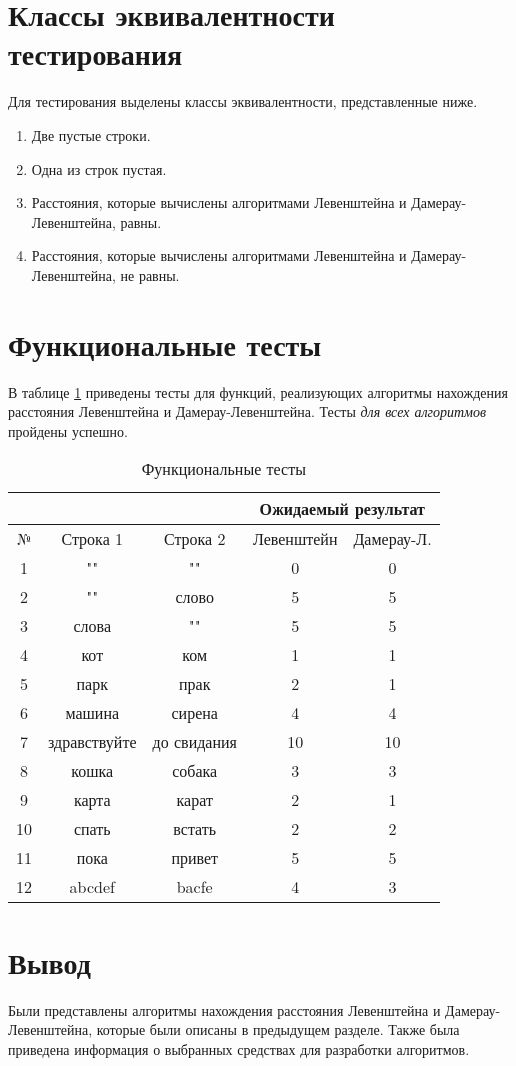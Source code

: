 \section{Классы эквивалентности тестирования}

Для тестирования выделены классы эквивалентности, представленные ниже.

\begin{enumerate}[label=\arabic*)]
	\item Две пустые строки.
	\item Одна из строк пустая.
	\item Расстояния, которые вычислены алгоритмами Левенштейна и Дамерау-Левенштейна, равны.
	\item Расстояния, которые вычислены алгоритмами Левенштейна и Дамерау-Левенштейна, не равны.
\end{enumerate}

\section{Функциональные тесты}

В таблице \ref{tbl:functional_test} приведены тесты для функций, реализующих алгоритмы нахождения расстояния Левенштейна и Дамерау-Левенштейна. Тесты \textit{для всех алгоритмов} пройдены успешно.

\begin{table}[h]
	\begin{center}
        \begin{threeparttable}
        \captionsetup{justification=raggedright,singlelinecheck=off}
		\caption{\label{tbl:functional_test} Функциональные тесты}
		\begin{tabular}{|c|c|c|c|c|}
			\hline
			& & & \multicolumn{2}{c|}{Ожидаемый результат} \\
			\hline
			№&Строка 1&Строка 2&Левенштейн&Дамерау-Л. \\
			\hline
            1&""&""&0&0 \\
            \hline
            2&""&слово&5&5 \\
            \hline
            3&слова&""&5&5 \\
            \hline
            4&кот&ком&1&1 \\
			\hline
			5&парк&прак&2&1 \\
			\hline
            6&машина&сирена&4&4 \\
			\hline
			7&здравствуйте&до свидания&10&10 \\
			\hline
            8&кошка&собака&3&3 \\
			\hline
            9&карта&карат&2&1 \\
			\hline
            10&спать&встать&2&2 \\
			\hline
			11&пока&привет&5&5 \\
			\hline
            12&abcdef&bacfe&4&3 \\
			\hline
		\end{tabular}
        \end{threeparttable}
	\end{center}
\end{table}

\section{Вывод}

Были представлены алгоритмы нахождения расстояния Левенштейна и Дамерау-Левенштейна, которые были описаны в предыдущем разделе. Также была приведена информация о выбранных средствах для разработки алгоритмов.
